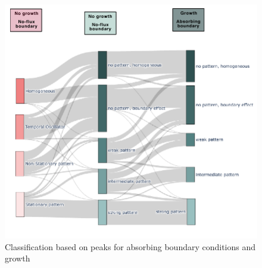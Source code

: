 \begin{figure}[H] %
    \centering
    \begin{adjustbox}{center}
        \includegraphics[width=1\textwidth]{chapters/Chapter 1/3layer_sankey} %
    \end{adjustbox}
    \caption{Classification based on peaks for absorbing boundary conditions and growth}
    \label{fig:3layer_sankey} %
\end{figure}








